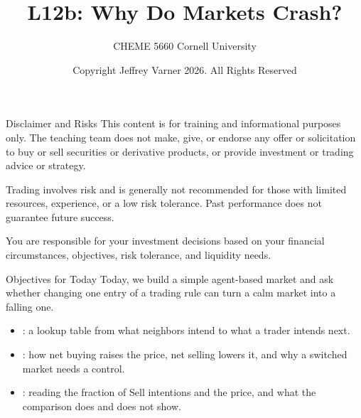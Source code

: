 \documentclass[aspectratio=169,11pt]{beamer}
\title{\texorpdfstring{{\vnheavy L12b}}{L12b}: Why Do Markets Crash?}
\subtitle{CHEME 5660 Cornell University}
\author{Copyright Jeffrey Varner 2026. All Rights Reserved}
\begin{document}
\vntitlepage

\begin{frame}{Disclaimer and Risks}
  \vspace{0.6em}
  \textbf{} This content is for training and informational
  purposes only. The teaching team does not make, give, or endorse any offer or
  solicitation to buy or sell securities or derivative products, or provide
  investment or trading advice or strategy.

  \vspace{1.1em}
  \textbf{} Trading involves risk and is generally not recommended for
  those with limited resources, experience, or a low risk tolerance. Past
  performance does not guarantee future success.

  \vspace{1.1em}
  \textbf{} You are responsible for your investment decisions
  based on your financial circumstances, objectives, risk tolerance, and
  liquidity needs.
\end{frame}

\begin{frame}{Objectives for Today}
  Today, we build a simple agent-based market and ask whether changing one entry
  of a trading rule can turn a calm market into a falling one.

  \vspace{0.5em}
  {\large\textbf{}}
  \begin{itemize}\setlength{\itemsep}{0.4em}
    \item {}: a lookup table from what neighbors intend to
      what a trader intends next.
    \item {}: how net buying raises the price, net selling lowers
      it, and why a switched market needs a control.
    \item {}: reading the fraction of Sell intentions and
      the price, and what the comparison does and does not show.
  \end{itemize}
\end{frame}
\end{document}
